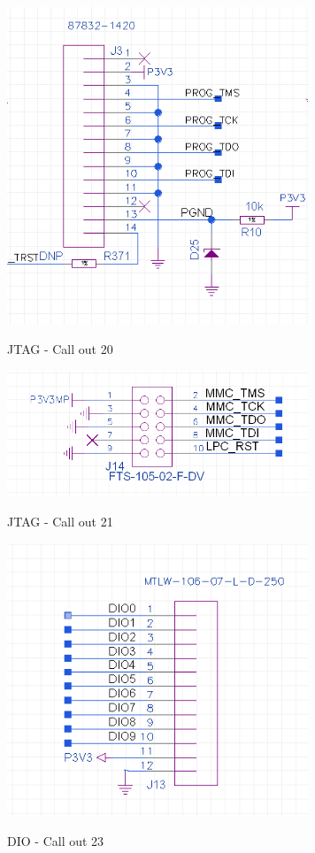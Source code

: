 		\begin{figure}[htbp!]
			\centering
			\includegraphics[width=9cm]{img/jtag1.png}\\
			\caption{JTAG - Call out 20}
		\end{figure}

		\begin{figure}[htbp!]
			\centering
			\includegraphics[width=9cm]{img/jtaglpc.png}\\
			\caption{JTAG - Call out  21}
		\end{figure}
		
		\begin{figure}[htbp!]
			\centering
			\includegraphics[width=9cm]{img/gpio.png}\\
			\caption{DIO - Call out 23}
		\end{figure}

